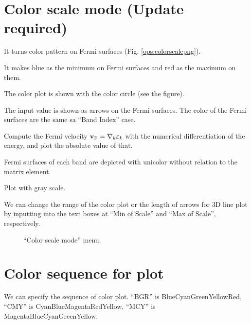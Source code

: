 \documentclass[letterpaper,10pt,pdftex,openany,english]{sphinxmanual}
\let\sphinxpxdimen\pdfpxdimen\else\newdimen\sphinxpxdimen
\begin{document}
\section{Color scale mode (Update required)}
\label{\detokenize{ops:color-scale-mode-update-required}}
\sphinxAtStartPar
It turns color pattern on Fermi surfaces (Fig. \ref{ops:colorscalepng}).
\begin{description}
\sphinxAtStartPar
It makes blue as the minimum on Fermi surfaces and red
as the maximum on them.

\sphinxAtStartPar
The color plot is shown with the color circle (see the figure).

\sphinxAtStartPar
The input value is shown as arrows on the Fermi surfaces.
The color of the Fermi surfaces are the same sa “Band Index” case.

\sphinxAtStartPar
Compute the Fermi velocity \({\bf v}_{\rm F} = \nabla_k \varepsilon_k\)
with the numerical differentiation of the energy,
and plot the absolute value of that.

\sphinxAtStartPar
Fermi surfaces of each band are depicted with uni\sphinxhyphen{}color
without relation to the matrix element.

\sphinxAtStartPar
Plot with gray scale.

\end{description}

\sphinxAtStartPar
We can change the range of the color plot or the length of arrows
for 3D line plot by inputting into the text boxes at
“Min of Scale” and “Max of Scale”, respectively.

\begin{figure}[htbp]
\centering
\capstart

\noindent\sphinxincludegraphics[width=700\sphinxpxdimen]{{colorscale}.png}
\caption{“Color scale mode” menu.}\label{\detokenize{ops:id4}}\label{\detokenize{ops:colorscalepng}}\end{figure}


\section{Color sequence for plot}
\label{\detokenize{ops:color-sequence-for-plot}}
\sphinxAtStartPar
We can specify the sequence of color plot.
“BGR” is Blue\sphinxhyphen{}Cyan\sphinxhyphen{}Green\sphinxhyphen{}Yellow\sphinxhyphen{}Red,
“CMY” is Cyan\sphinxhyphen{}Blue\sphinxhyphen{}Magenta\sphinxhyphen{}Red\sphinxhyphen{}Yellow,
“MCY” is Magenta\sphinxhyphen{}Blue\sphinxhyphen{}Cyan\sphinxhyphen{}Green\sphinxhyphen{}Yellow.
\end{document}
